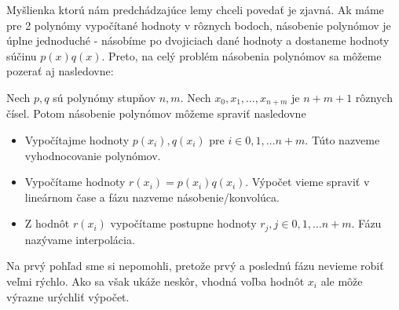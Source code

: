 Myšlienka ktorú nám predchádzajúce lemy chceli povedať je zjavná. Ak
máme pre 2 polynómy vypočítané hodnoty v rôznych bodoch, násobenie
polynómov je úplne jednoduché - násobíme po dvojiciach dané hodnoty a
dostaneme hodnoty súčinu $p(x)q(x)$. Preto, na celý problém násobenia
polynómov sa môžeme pozerať aj nasledovne:

Nech $p,q$ sú polynómy stupňov $n,m$. Nech $x_0,x_1,\dots, x_{n+m}$ je
$n+m+1$ rôznych čísel. Potom násobenie polynómov môžeme spraviť
nasledovne
\begin{itemize}
  \item Vypočítajme hodnoty $p(x_i), q(x_i)$ pre $i\in0,1,\dots n+m$.
  Túto nazveme vyhodnocovanie polynómov.
  \item Vypočítame hodnoty $r(x_i) = p(x_i) q(x_i)$. Výpočet vieme
  spraviť v lineárnom čase a fázu nazveme násobenie/konvolúca.
  \item Z hodnôt $r(x_i)$ vypočítame postupne hodnoty $r_j, j\in
  0,1,\dots n+m$. Fázu nazývame interpolácia.
\end{itemize}

Na prvý pohľad sme si nepomohli, pretože prvý a poslednú fázu nevieme
robiť veľmi rýchlo. Ako sa však ukáže neskôr, vhodná voľba hodnôt
$x_i$ ale môže výrazne urýchliť výpočet.
